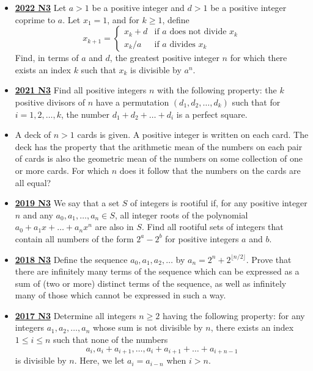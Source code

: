 \documentclass[11pt]{scrartcl}
\begin{document}
\begin{itemize}[leftmargin=*]
\item \href{https://artofproblemsolving.com/community/c6h3107336p28104282}{\textbf{2022 N3}} Let $a > 1$ be a positive integer and $d > 1$ be a positive integer coprime to $a$. Let $x_1=1$, and for $k\geqslant  1$, define
$$x_{k+1} = \begin{cases}
x_k + d &\text{if } a \text{ does not divide } x_k \\
x_k/a & \text{if } a \text{ divides } x_k
\end{cases}$$Find, in terms of $a$ and $d$, the greatest positive integer $n$ for which there exists an index $k$ such that $x_k$ is divisible by $a^n$.
\item \href{https://artofproblemsolving.com/community/c6h2882565p25627623}{\textbf{2021 N3}} Find all positive integers $n$ with the following property: the $k$ positive divisors of $n$ have a permutation $(d_1,d_2,\dots,d_k)$ such that for $i=1,2,\dots,k$, the number $d_1+d_2+\dots+d_i$ is a perfect square.
\item {} A deck of $n > 1$ cards is given. A positive integer is written on each card. The deck has the property that the arithmetic mean of the numbers on each pair of cards is also the geometric mean of the numbers on some collection of one or more cards.
For which $n$ does it follow that the numbers on the cards are all equal?
\item \href{https://artofproblemsolving.com/community/c6h2279036p17829189}{\textbf{2019 N3}} We say that a set $S$ of integers is rootiful if, for any positive integer $n$ and any $a_0, a_1, \dots, a_n \in S$, all integer roots of the polynomial $a_0+a_1x+\dots+a_nx^n$ are also in $S$. Find all rootiful sets of integers that contain all numbers of the form $2^a - 2^b$ for positive integers $a$ and $b$.
\item \href{https://artofproblemsolving.com/community/c6h1876764p12752823}{\textbf{2018 N3}} 	Define the sequence $a_0,a_1,a_2,\hdots$ by $a_n=2^n+2^{\lfloor n/2\rfloor}$. Prove that there are infinitely many terms of the sequence which can be expressed as a sum of (two or more) distinct terms of the sequence, as well as infinitely many of those which cannot be expressed in such a way.
\newpage
\item \href{https://artofproblemsolving.com/community/c6h1671289p10632346}{\textbf{2017 N3}} 	Determine all integers $ n\geqslant  2$ having the following property: for any integers $a_1,a_2,\dots, a_n$ whose sum is not divisible by $n$, there exists an index $1 \leqslant i \leqslant n$ such that none of the numbers$$a_i,a_i+a_{i+1},\dots,a_i+a_{i+1}+\dots+a_{i+n-1}$$is divisible by $n$. Here, we let $a_i=a_{i-n}$ when $i >n$.


\end{itemize}
\end{document}
